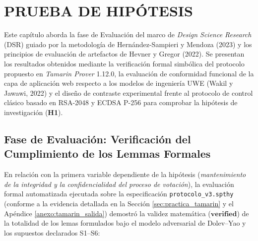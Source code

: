 \chapter{PRUEBA DE HIPÓTESIS}
\label{cap:prueba_hipotesis}

Este capítulo aborda la fase de Evaluación del marco de \textit{Design Science Research} (DSR) guiado por la metodología de Hernández-Sampieri y Mendoza (2023) y los principios de evaluación de artefactos de Hevner y Gregor (2022). Se presentan los resultados obtenidos mediante la verificación formal simbólica del protocolo propuesto en \textit{Tamarin Prover} 1.12.0, la evaluación de conformidad funcional de la capa de aplicación web respecto a los modelos de ingeniería UWE (Wakil y Jawawi, 2022) y el diseño de contraste experimental frente al protocolo de control clásico basado en RSA-2048 y ECDSA P-256 para comprobar la hipótesis de investigación (\textbf{H1}).

\section{Fase de Evaluación: Verificación del Cumplimiento de los Lemmas Formales}
\label{sec:eval_tamarin_cap4}

En relación con la primera variable dependiente de la hipótesis (\textit{mantenimiento de la integridad y la confidencialidad del proceso de votación}), la evaluación formal automatizada ejecutada sobre la especificación \texttt{protocolo\_v3.spthy} (conforme a la evidencia detallada en la Sección \ref{sec:practica_tamarin} y el Apéndice \ref{anexo:tamarin_salida}) demostró la validez matemática ($\textbf{verified}$) de la totalidad de los lemas formulados bajo el modelo adversarial de Dolev--Yao y los supuestos declarados S1--S6:

